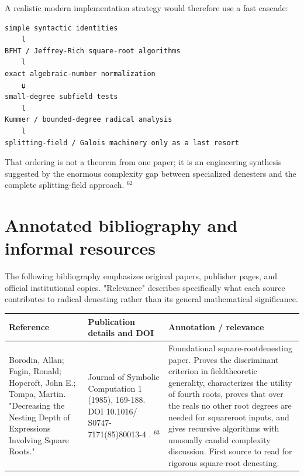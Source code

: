 \documentclass[10pt]{article}
\begin{document}
A realistic modern implementation strategy would therefore use a fast cascade:

\begin{verbatim}
simple syntactic identities
    l
BFHT / Jeffrey-Rich square-root algorithms
    l
exact algebraic-number normalization
    џ
small-degree subfield tests
    l
Kummer / bounded-degree radical analysis
    l
splitting-field / Galois machinery only as a last resort
\end{verbatim}

That ordering is not a theorem from one paper; it is an engineering synthesis suggested by the enormous complexity gap between specialized denesters and the complete splitting-field approach. ${ }^{62}$

\section*{Annotated bibliography and informal resources}
The following bibliography emphasizes original papers, publisher pages, and official institutional copies. "Relevance" describes specifically what each source contributes to radical denesting rather than its general mathematical significance.

\begin{center}
\begin{tabular}[t]{|l|l|l|}
\hline
Reference & Publication details and DOI & Annotation / relevance \\
\hline
Borodin, Allan; Fagin, Ronald; Hopcroft, John E.; Tompa, Martin. "Decreasing the Nesting Depth of Expressions Involving Square Roots." & Journal of Symbolic Computation 1 (1985), 169-188. DOI 10.1016/ S0747-7171(85)80013-4 . ${ }^{63}$ & Foundational square-rootdenesting paper. Proves the discriminant criterion in fieldtheoretic generality, characterizes the utility of fourth roots, proves that over the reals no other root degrees are needed for squareroot inputs, and gives recursive algorithms with unusually candid complexity discussion. First source to read for rigorous square-root denesting. \\
\hline
\end{tabular}
\end{center}
\end{document}
